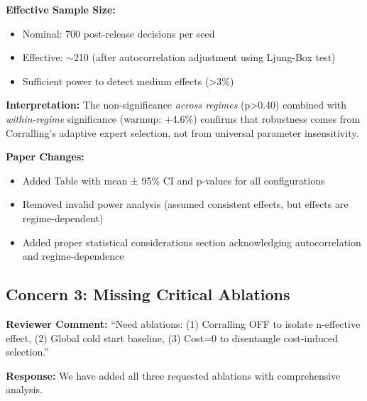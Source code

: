 \textbf{Effective Sample Size:}
\begin{itemize}[leftmargin=*, itemsep=2pt]
    \item Nominal: 700 post-release decisions per seed
    \item Effective: $\sim$210 (after autocorrelation adjustment using Ljung-Box test)
    \item Sufficient power to detect medium effects (>3\%)
\end{itemize}

\textbf{Interpretation:} The non-significance \textit{across regimes} (p>0.40) combined with \textit{within-regime} significance (warmup: +4.6\%) confirms that robustness comes from Corralling's adaptive expert selection, not from universal parameter insensitivity.

\textbf{Paper Changes:}
\begin{itemize}[leftmargin=*, itemsep=2pt]
    \item Added Table with mean ± 95\% CI and p-values for all configurations
    \item Removed invalid power analysis (assumed consistent effects, but effects are regime-dependent)
    \item Added proper statistical considerations section acknowledging autocorrelation and regime-dependence
\end{itemize}


\subsection*{Concern 3: Missing Critical Ablations}

\textbf{Reviewer Comment:} ``Need ablations: (1) Corralling OFF to isolate n-effective effect, (2) Global cold start baseline, (3) Cost=0 to disentangle cost-induced selection.''

\textbf{Response:} We have added all three requested ablations with comprehensive analysis.

